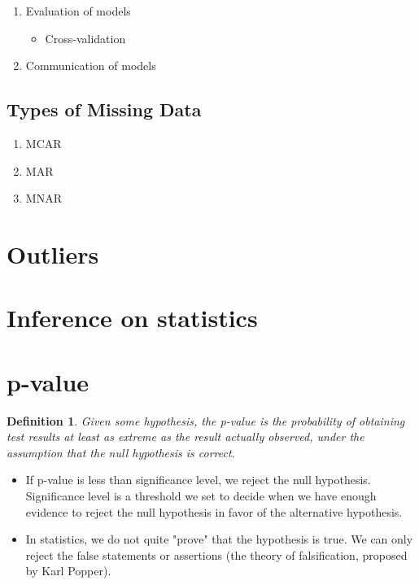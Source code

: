 \documentclass[11pt,reqno]{amsart}
\newtheorem{definition}{Definition}
\theoremstyle{remark}
\begin{document}
\begin{enumerate}
\item Evaluation of models
\begin{itemize}
\item Cross-validation
\end{itemize}

\item Communication of models
\end{enumerate}

\subsection{Types of Missing Data}
\begin{enumerate}
\item MCAR
\item MAR
\item MNAR
\end{enumerate}


\section{Outliers}
\section{Inference on statistics}
\section{p-value}
\begin{definition}
Given some hypothesis, the p-value is the probability of obtaining test results at least as extreme as 
the result actually observed, under the assumption that the null hypothesis is correct.
\end{definition}
\begin{itemize}
\item If p-value is less than significance level, we reject the null hypothesis. Significance 
level is a threshold we set to decide when we have enough evidence to reject the null hypothesis in favor of the alternative hypothesis.
\item In statistics, we do not quite "prove" that the hypothesis is true. We can only reject the false statements or assertions (the theory of falsification, proposed by Karl Popper). 
\end{itemize}
\end{document}

